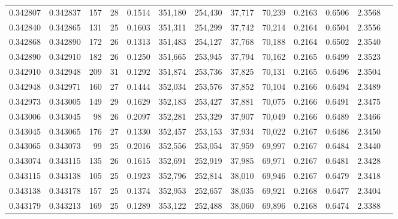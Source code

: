 \begin{tabular}{rrrrrrrrrrrrr}
0.342807 & 0.342837 &   157 &  28 &                                     0.1514 & 351,180 & 254,430 &  37,717 &  70,239 & 0.2163 & 0.6506 & 2.3568 \\
0.342840 & 0.342865 &   131 &  25 &                                     0.1603 & 351,311 & 254,299 &  37,742 &  70,214 & 0.2164 & 0.6504 & 2.3556 \\
0.342868 & 0.342890 &   172 &  26 &                                     0.1313 & 351,483 & 254,127 &  37,768 &  70,188 & 0.2164 & 0.6502 & 2.3540 \\
0.342890 & 0.342910 &   182 &  26 &                                     0.1250 & 351,665 & 253,945 &  37,794 &  70,162 & 0.2165 & 0.6499 & 2.3523 \\
0.342910 & 0.342948 &   209 &  31 &                                     0.1292 & 351,874 & 253,736 &  37,825 &  70,131 & 0.2165 & 0.6496 & 2.3504 \\
0.342948 & 0.342971 &   160 &  27 &                                     0.1444 & 352,034 & 253,576 &  37,852 &  70,104 & 0.2166 & 0.6494 & 2.3489 \\
0.342973 & 0.343005 &   149 &  29 &                                     0.1629 & 352,183 & 253,427 &  37,881 &  70,075 & 0.2166 & 0.6491 & 2.3475 \\
0.343006 & 0.343045 &    98 &  26 &                                     0.2097 & 352,281 & 253,329 &  37,907 &  70,049 & 0.2166 & 0.6489 & 2.3466 \\
0.343045 & 0.343065 &   176 &  27 &                                     0.1330 & 352,457 & 253,153 &  37,934 &  70,022 & 0.2167 & 0.6486 & 2.3450 \\
0.343065 & 0.343073 &    99 &  25 &                                     0.2016 & 352,556 & 253,054 &  37,959 &  69,997 & 0.2167 & 0.6484 & 2.3440 \\
0.343074 & 0.343115 &   135 &  26 &                                     0.1615 & 352,691 & 252,919 &  37,985 &  69,971 & 0.2167 & 0.6481 & 2.3428 \\
0.343115 & 0.343138 &   105 &  25 &                                     0.1923 & 352,796 & 252,814 &  38,010 &  69,946 & 0.2167 & 0.6479 & 2.3418 \\
0.343138 & 0.343178 &   157 &  25 &                                     0.1374 & 352,953 & 252,657 &  38,035 &  69,921 & 0.2168 & 0.6477 & 2.3404 \\
0.343179 & 0.343213 &   169 &  25 &                                     0.1289 & 353,122 & 252,488 &  38,060 &  69,896 & 0.2168 & 0.6474 & 2.3388 \\

\end{tabular}
